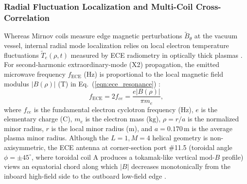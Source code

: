 \subsubsection{Radial Fluctuation Localization and Multi-Coil Cross-Correlation}
\label{subsubsec:theory_ece_radial}
Whereas Mirnov coils measure edge magnetic perturbations $\tilde{B}_\theta$ at the vacuum vessel, internal radial mode localization relies on local electron temperature fluctuations $\tilde{T}_e(\rho, t)$ measured by ECE radiometry in optically thick plasmas \cite{KraemerFlecken2024, luo2020measurement}. For second-harmonic extraordinary-mode (X2) propagation, the emitted microwave frequency $f_{\mathrm{ECE}}$ ($\mathrm{Hz}$) is proportional to the local magnetic field modulus $|B(\rho)|$ ($\mathrm{T}$) in Eq.~(\ref{eqn:ece_resonance}) \cite{chen2016introduction, nagasaki2020heliotron, luo2020measurement}:
\begin{equation}
\label{eqn:ece_resonance}
f_{\mathrm{ECE}} = 2 f_{ce} = \frac{e |B(\rho)|}{\pi m_e},
\end{equation}
\noindent where $f_{ce}$ is the fundamental electron cyclotron frequency ($\mathrm{Hz}$), $e$ is the elementary charge ($\mathrm{C}$), $m_e$ is the electron mass ($\mathrm{kg}$), $\rho = r/a$ is the normalized minor radius, $r$ is the local minor radius ($\mathrm{m}$), and $a = 0.170\,\mathrm{m}$ is the average plasma minor radius. Although the $L=1, M=4$ helical geometry is non-axisymmetric, the ECE antenna at corner-section port \#11.5 (toroidal angle $\phi = \pm 45^\circ$, where toroidal coil A produces a tokamak-like vertical $\mathrm{mod}\text{-}B$ profile) views an equatorial chord along which $|B|$ decreases monotonically from the inboard high-field side to the outboard low-field edge \cite{luo2020measurement, Weir2019}.

